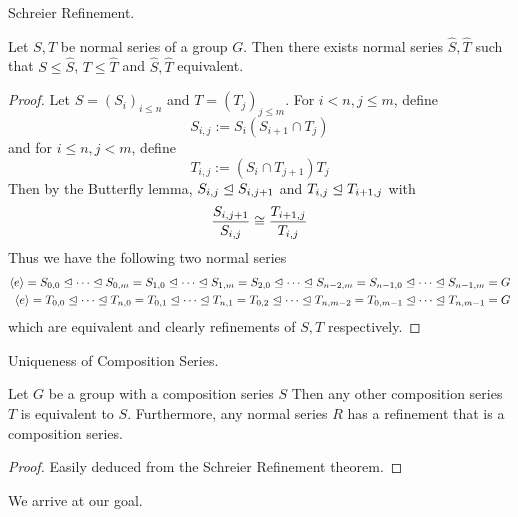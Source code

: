 \documentclass[../../book.tex]{subfiles}
\begin{document}
\begin{thm} Schreier Refinement. 
    
    Let $S, T$ be normal series of a group $G$. 
    Then there exists normal series $\hat{S}, \hat{T}$ such that
    $S \leq \hat{S}$, $T \leq \hat{T}$ and $\hat{S}, \hat{T}$ equivalent. 
    
\end{thm}
\begin{proof}
    
    Let $S = (S_i)_{i \leq n}$ and $T = (T_j)_{j \leq m}$. 
    For $i < n, j \leq m$, define \[
        S_{i,j} := S_i (S_{i+1} \cap T_j)
    \]
    and for $i \leq n, j < m$, define \[
        T_{i,j} := (S_{i} \cap T_{j+1}) T_j
    \]
    Then by the Butterfly lemma, 
    $S_{i,j} \trianglelefteq S_{i,j+1}$ and $T_{i,j} \trianglelefteq T_{i+1,j}$
    with \[
        \frac{S_{i,j+1}}{S_{i,j}} \cong \frac{T_{i+1,j}}{T_{i,j}}
    \]
    Thus we have the following two normal series \begin{align*}
        \langle e\rangle = S_{0,0} \trianglelefteq \cdots \trianglelefteq S_{0,m} 
        = S_{1,0} \trianglelefteq \cdots \trianglelefteq S_{1,m}
        = S_{2,0} \trianglelefteq \cdots \trianglelefteq S_{n-2,m}
        = S_{n-1,0} \trianglelefteq \cdots \trianglelefteq S_{n-1,m} = G
        \\
        \langle e\rangle = T_{0,0} \trianglelefteq \cdots \trianglelefteq T_{n,0} 
        = T_{0,1} \trianglelefteq \cdots \trianglelefteq T_{n,1} 
        = T_{0,2}\trianglelefteq \cdots \trianglelefteq T_{n,m-2}
        = T_{0,m-1} \trianglelefteq \cdots \trianglelefteq T_{n,m-1} = G
    \end{align*}
    which are equivalent and clearly refinements of $S, T$ respectively. 
    
\end{proof}
\begin{thm} Uniqueness of Composition Series.
    
    Let $G$ be a group with a composition series $S$
    Then any other composition series $T$ is equivalent to $S$.
    Furthermore, any normal series $R$ has a refinement that is a composition series.
    
\end{thm}
\begin{proof}
    
    Easily deduced from the Schreier Refinement theorem.
    
\end{proof}

We arrive at our goal.
\end{document}
